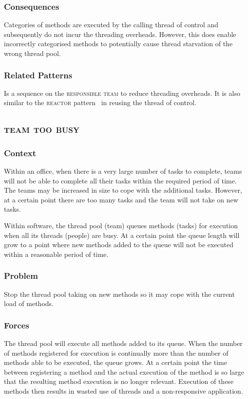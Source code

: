 \documentclass[prodmode]{style/acmlarge}
\begin{document}
\subsubsection*{Consequences} Categories of methods are executed by the calling
thread of control and subsequently do not incur the threading overheads. 
However, this does enable incorrectly categorised methods to potentially cause
thread starvation of the wrong thread pool.

\subsubsection*{Related Patterns} Is a sequence on the \textsc{responsible team}
to reduce threading overheads.  It is also similar to the \textsc{reactor}
pattern~\cite{reactor} in reusing the thread of control.



\subsection{\textsc{\textbf{team too busy}}}

\subsubsection*{Context} Within an office, when there is a very large number of
tasks to complete, teams will not be able to complete all their tasks within the
required period of time.  The teams may be increased in size to cope with the
additional tasks.  However, at a certain point there are too many tasks and the
team will not take on new tasks.

Within software, the thread pool (team) queues methods (tasks) for execution
when all its threads (people) are busy.  At a certain point the queue length
will grow to a point where new methods added to the queue will not be executed
within a reasonable period of time.

\subsubsection*{\textbf{Problem}} Stop the thread pool taking on new methods so
it may cope with the current load of methods.

\subsubsection*{Forces} The thread pool will execute all methods added to its
queue.  When the number of methods registered for execution is continually more
than the number of methods able to be executed, the queue grows.  At a certain
point the time between registering a method and the actual execution of the
method is so large that the resulting method execution is no longer relevant. 
Execution of these methods then results in wasted use of threads and a
non-responsive application.
\end{document}
